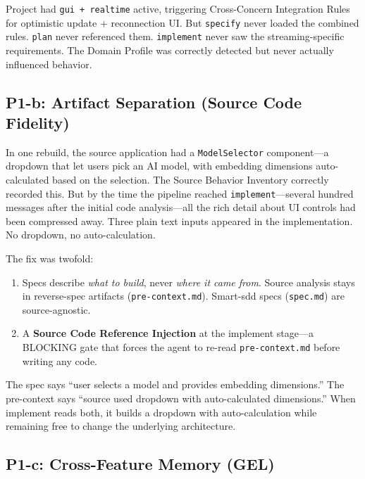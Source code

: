 \documentclass[11pt,a4paper,openright,twoside]{report}
\newcommand{\file}[1]{\texttt{#1}}
\begin{document}
\begin{warnbox}
Project had \texttt{gui + realtime} active, triggering Cross-Concern Integration Rules for optimistic update + reconnection UI. But \texttt{specify} never loaded the combined rules. \texttt{plan} never referenced them. \texttt{implement} never saw the streaming-specific requirements. The Domain Profile was correctly detected but never actually influenced behavior.
\end{warnbox}

\subsection{P1-b: Artifact Separation (Source Code Fidelity)}

In one rebuild, the source application had a \texttt{ModelSelector} component---a dropdown that let users pick an AI model, with embedding dimensions auto-calculated based on the selection. The Source Behavior Inventory correctly recorded this. But by the time the pipeline reached \texttt{implement}---several hundred messages after the initial code analysis---all the rich detail about UI controls had been compressed away. Three plain text inputs appeared in the implementation. No dropdown, no auto-calculation.

The fix was twofold:

\begin{enumerate}
  \item Specs describe \emph{what to build}, never \emph{where it came from}. Source analysis stays in reverse-spec artifacts (\file{pre-context.md}). Smart-sdd specs (\file{spec.md}) are source-agnostic.
  \item A \textbf{Source Code Reference Injection} at the implement stage---a BLOCKING gate that forces the agent to re-read \file{pre-context.md} before writing any code.
\end{enumerate}

The spec says ``user selects a model and provides embedding dimensions.'' The pre-context says ``source used dropdown with auto-calculated dimensions.'' When implement reads both, it builds a dropdown with auto-calculation while remaining free to change the underlying architecture.

\subsection{P1-c: Cross-Feature Memory (GEL)}
\end{document}
